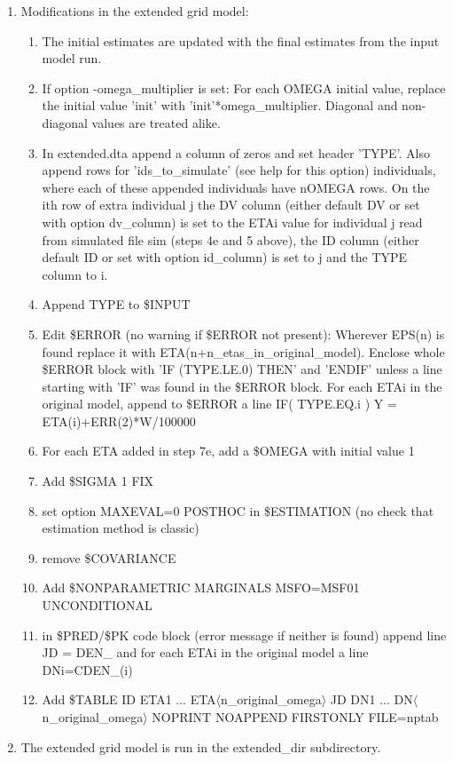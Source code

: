 \begin{enumerate}
\item Modifications in the extended grid model:
	\begin{enumerate} 
		\item The initial estimates are updated with the final estimates from the input model run.
		\item If option -omega\_multiplier is set: For each OMEGA initial value, replace the initial value 'init' with 'init'*omega\_multiplier. Diagonal and non-diagonal values are treated alike. 
		\item In extended.dta append a column of zeros and set header 'TYPE'. Also append rows for 'ids\_to\_simulate' (see help for this option) individuals, where each of these appended individuals have nOMEGA rows. On the ith row of extra individual j the DV column (either default DV or set with option dv\_column) is set to the ETAi value for individual j read from simulated file sim (steps 4e and 5 above), the ID column (either default ID or set with option id\_column) is set to j and the TYPE column to i.     
		\item Append TYPE to \$INPUT
		\item Edit \$ERROR (no warning if \$ERROR not present): Wherever EPS(n) is found replace it with ETA(n+n\_etas\_in\_original\_model). Enclose whole \$ERROR block with 'IF (TYPE.LE.0) THEN' and 'ENDIF' unless a line starting with 'IF' was found in the \$ERROR block. For each ETAi in the original model, append to \$ERROR a line
 IF( TYPE.EQ.i ) Y = ETA(i)+ERR(2)*W/100000
		\item For each ETA added in step 7e, add a \$OMEGA with initial value 1
		\item Add \$SIGMA 1 FIX
		\item set option MAXEVAL=0 POSTHOC in \$ESTIMATION (no check that estimation method is classic)
		\item remove \$COVARIANCE
		\item Add \$NONPARAMETRIC MARGINALS MSFO=MSF01 UNCONDITIONAL
		\item in \$PRED/\$PK code block (error message if neither is found) append line
 JD = DEN\_
and for each ETAi in the original model a line  
DNi=CDEN\_(i)
		\item Add \$TABLE ID ETA1 ... ETA$\langle$n\_original\_omega$\rangle$ JD DN1 ... DN$\langle$n\_original\_omega$\rangle$ NOPRINT NOAPPEND FIRSTONLY FILE=nptab
	\end{enumerate}
\item The extended grid model is run in the extended\_dir subdirectory.

\end{enumerate}
